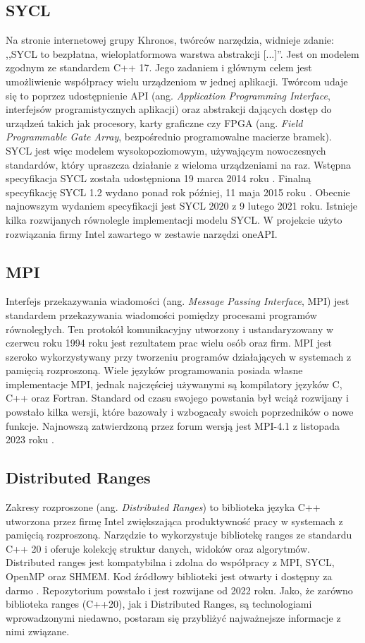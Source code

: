 \documentclass[a4paper,12pt]{book} %
\begin{document}
\subsection{SYCL}
Na stronie internetowej grupy Khronos, twórców narzędzia, widnieje zdanie: ,,SYCL to bezpłatna, wieloplatformowa warstwa abstrakcji [...]''\cite{SYCL-overview}. Jest on modelem zgodnym ze standardem C++ 17. Jego zadaniem i głównym celem jest umożliwienie współpracy wielu urządzeniom w jednej aplikacji. Twórcom udaje się to poprzez udostępnienie API (ang. \emph{Application Programming Interface}, interfejsów programistycznych aplikacji) oraz abstrakcji dających dostęp do urządzeń takich jak procesory, karty graficzne czy FPGA (ang. \emph{Field Programmable Gate Array}, bezpośrednio programowalne macierze bramek). SYCL jest więc modelem wysokopoziomowym, używającym nowoczesnych standardów, który upraszcza działanie z wieloma urządzeniami na raz. Wstępna specyfikacja SYCL została udostępniona 19 marca 2014 roku \cite{SYCL1.2-provisional}. Finalną specyfikację SYCL 1.2 wydano ponad rok później, 11 maja 2015 roku \cite{SYCL1.2}. Obecnie najnowszym wydaniem specyfikacji jest SYCL 2020 z 9 lutego 2021 roku. Istnieje kilka rozwijanych równolegle implementacji modelu SYCL. W projekcie użyto rozwiązania firmy Intel zawartego w zestawie narzędzi oneAPI.
\subsection{MPI}
Interfejs przekazywania wiadomości (ang. \emph{Message Passing Interface}, MPI) jest standardem przekazywania wiadomości pomiędzy  procesami programów równoległych. Ten protokół komunikacyjny utworzony i ustandaryzowany w czerwcu roku 1994 roku jest rezultatem prac wielu osób oraz firm. MPI jest szeroko wykorzystywany przy tworzeniu programów działających w systemach z pamięcią rozproszoną. Wiele języków programowania posiada własne implementacje MPI, jednak najczęściej używanymi są kompilatory języków C, C++ oraz Fortran. Standard od czasu swojego powstania był wciąż rozwijany i powstało kilka wersji, które bazowały i wzbogacały swoich poprzedników o nowe funkcje. Najnowszą zatwierdzoną przez forum wersją jest MPI-4.1 z listopada 2023 roku \cite{mpi41}.
\subsection{Distributed Ranges}
Zakresy rozproszone (ang. \emph{Distributed Ranges}) to biblioteka języka C++ utworzona przez firmę Intel zwiększająca produktywność pracy w systemach z pamięcią rozproszoną. Narzędzie to wykorzystuje bibliotekę ranges ze standardu C++ 20 i oferuje kolekcję struktur danych, widoków oraz algorytmów. Distributed ranges jest kompatybilna i zdolna do współpracy z MPI, SYCL, OpenMP oraz SHMEM. Kod źródłowy biblioteki jest otwarty i dostępny za darmo \cite{dist-ranges}. Repozytorium powstało i jest rozwijane od 2022 roku. Jako, że zarówno biblioteka ranges (C++20), jak i Distributed Ranges, są technologiami wprowadzonymi niedawno, postaram się przybliżyć najważnejsze informacje z nimi związane.
\end{document}
